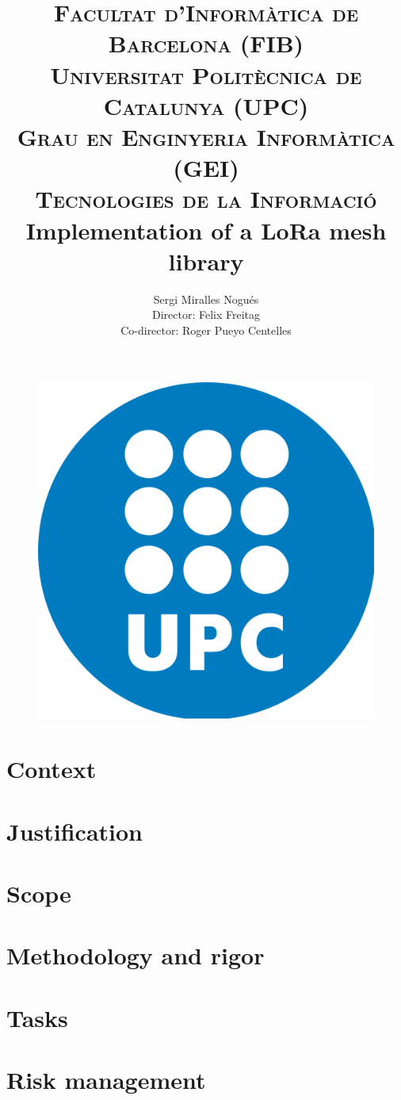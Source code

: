 \documentclass[11pt,a4paper,titlepage]{article}
\author{ \LARGE Sergi Miralles Nogués\vspace{4mm} \\ Director: Felix Freitag  \\ Co-director: Roger Pueyo Centelles}
\title{\vspace{-15mm}\textsc{\Large Facultat d'Informàtica de Barcelona (FIB)}\\\textsc{\Large Universitat Politècnica de Catalunya (UPC)\vspace{5mm}}\\\textsc{\large Grau en Enginyeria Informàtica (GEI)}\\\textsc{\large Tecnologies de la Informació}\\{\vspace{30mm}\huge \bfseries \fontfamily{lmss}\selectfont Implementation of a LoRa mesh library}  \\ { \LARGE \textsc{}}}
\begin{document}
	\begin{figure}
		\centering
		\includegraphics[width=0.2\linewidth]{Figures/upc.png}
	\end{figure}

	\maketitle

    
    

    \tableofcontents
    \newpage
    
    
    \listoffigures
    \newpage
    
    \listoftables
    \newpage
    
	\lstlistoflistings
	\newpage
	
	
    
    \newpage
    
	\setcounter{page}{1}
    \section{Context}
    
    \section{Justification}
    
    \section{Scope}
    
    \section{Methodology and rigor}
    
    \section{Tasks}
    
    \section{Risk management}
    
\end{document}
